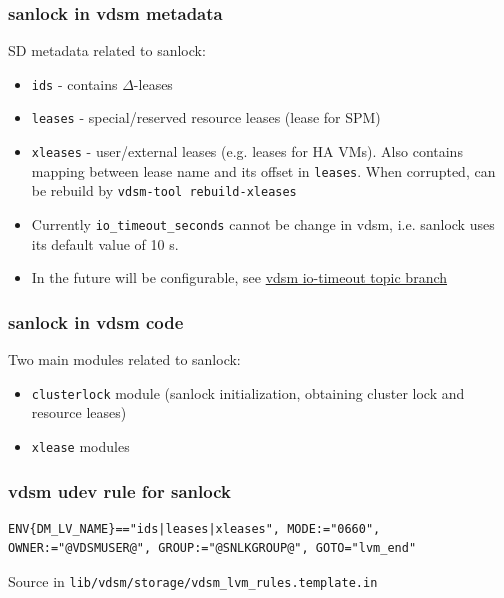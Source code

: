 \documentclass[10pt,utf8]{beamer}
\begin{document}
\begin{frame}
    \frametitle{sanlock in vdsm metadata}
    SD metadata related to sanlock:
    \begin{itemize}
        \item \texttt{ids} - contains $\Delta$-leases
        \item \texttt{leases} - special/reserved resource leases (lease for SPM)
        \item \texttt{xleases} - user/external leases (e.g. leases for HA VMs). Also contains mapping between lease name and its offset in \texttt{leases}. When corrupted, can be rebuild by \texttt{vdsm-tool rebuild-xleases}
        \item Currently \texttt{io\_timeout\_seconds} cannot be change in vdsm, i.e. sanlock uses its default value of 10 s.
        \item In the future will be configurable, see \color{blue}\href{https://gerrit.ovirt.org/\#/q/project:vdsm+branch:master+topic:io-timeout}{vdsm io-timeout topic branch}\color{black}
    \end{itemize}
\end{frame}

\begin{frame}
  \frametitle{sanlock in vdsm code}
  Two main modules related to sanlock:
    \begin{itemize}
        \item \texttt{clusterlock} module (sanlock initialization, obtaining cluster lock and resource leases)
        \item \texttt{xlease} modules
    \end{itemize}
\end{frame}

\begin{frame}[fragile]
    \frametitle{vdsm udev rule for sanlock}
    \begin{lstlisting}[style=bash]
ENV{DM_LV_NAME}=="ids|leases|xleases", MODE:="0660", OWNER:="@VDSMUSER@", GROUP:="@SNLKGROUP@", GOTO="lvm_end"
    \end{lstlisting}
    Source in \texttt{lib/vdsm/storage/vdsm\_lvm\_rules.template.in}
\end{frame}
\end{document}
